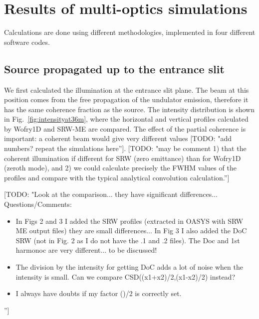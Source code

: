 \documentclass{iucr}              %
\newcommand{\todo}[1]{{\color{red}[TODO: "#1'']}}
\begin{document}
\section{Results of multi-optics simulations}
\label{sec:complete-beamline}

Calculations are done using different methodologies, implemented in four different software codes. 

\subsection{Source propagated up to the entrance slit}

We first calculated the illumination at the entrance slit plane. The beam at this position comes from the free propagation of the undulator emission, therefore it has the same coherence fraction as the source. The intensity distribution is shown in Fig.~\ref{fig:intensityat36m}, where the horizontal and vertical profiles calculated by Wofry1D and SRW-ME are compared. The effect of the partial coherence is important: a coherent beam would give very different values \todo{add numbers? repeat the simulations here}. \todo{may be comment 1) that the coherent illumination if different for SRW (zero emittance) than for Wofry1D (zeroth mode), and 2) we could calculate precisely the FWHM values of the profiles and compare with the typical analytical convolution calculation.}   

\todo{Look at the comparison... they have significant differences... Questions/Comments: 
\begin{itemize}
    \item  In Figs 2 and 3 I added the SRW profiles (extracted in OASYS with SRW ME output files) they are small differences... In Fig 3 I also added the DoC SRW (not in Fig. 2 as I do not have the .1 and .2 files). The Doc and 1st harmonoc are very different... to be discussed! 
    \item The division by the intensity for getting DoC adds a lot of noise when the intensity is small. Can we compare CSD((x1+x2)/2,(x1-x2)/2) instead? 
    \item I always have doubts if my factor ()/2 is correctly set.
\end{itemize}
}
\end{document}
